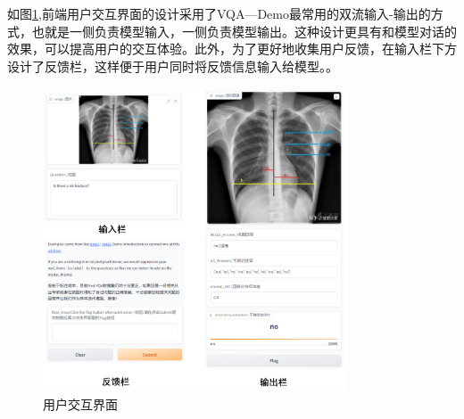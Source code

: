 如图\ref{demo_sum},前端用户交互界面的设计采用了VQA—Demo最常用的双流输入-输出的方式，也就是一侧负责模型输入，一侧负责模型输出。这种设计更具有和模型对话的效果，可以提高用户的交互体验。此外，为了更好地收集用户反馈，在输入栏下方设计了反馈栏，这样便于用户同时将反馈信息输入给模型。。
\begin{figure}[htbp]
	\centering	
	\includegraphics[width=0.8\textwidth]{Fig/myfig/chapter5/demo_sum.png}  %
	\caption{\label{demo_sum}用户交互界面} 
\end{figure}

